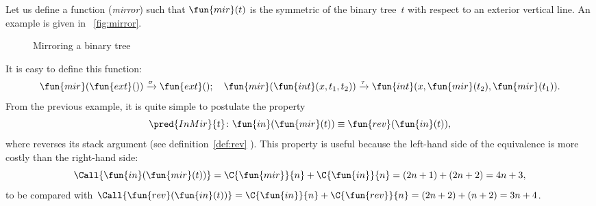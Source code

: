 Let us define a function 
(\emph{mirror}) such that \(\fun{mir}(t)\) is the symmetric of the
binary tree~\(t\) with respect to an exterior vertical line. An
example is given in \fig~\vref{fig:mirror}.
\begin{figure}[t]
\centering
\subfloat[\(t\)]{\texttt{[image: bt\_ex2]}}
\qquad
{}
\caption{Mirroring a binary tree}
\label{fig:mirror}
\end{figure}
It is easy to define this function:
\begin{equation*}
\fun{mir}(\fun{ext}()) \xrightarrow{\smash{\sigma}} \fun{ext}();
\quad
\fun{mir}(\fun{int}(x,t_1,t_2)) \xrightarrow{\smash{\tau}}
\fun{int}(x,\fun{mir}(t_2),\fun{mir}(t_1)).
\end{equation*}
From the previous example, it is quite simple to postulate the
property
\begin{equation*}
\pred{InMir}{t} \colon \fun{in}(\fun{mir}(t)) \equiv
\fun{rev}(\fun{in}(t)),\index{InMir@\predName{InMir}}
\end{equation*}
where 
reverses its stack argument (see
definition~\eqref{def:rev} ). This property is useful
because the left\hyp{}hand side of the equivalence is more costly than
the right\hyp{}hand side:
\begin{equation*}
  \Call{\fun{in}(\fun{mir}(t))} =
  \C{\fun{mir}}{n} + \C{\fun{in}}{n} = (2n+1) + (2n+2) = 4n + 3,
\end{equation*}
to be compared with \(\Call{\fun{rev}(\fun{in}(t))} = \C{\fun{in}}{n}
+ \C{\fun{rev}}{n} = (2n+2) + (n+2) = 3n +
4\).

\medskip

